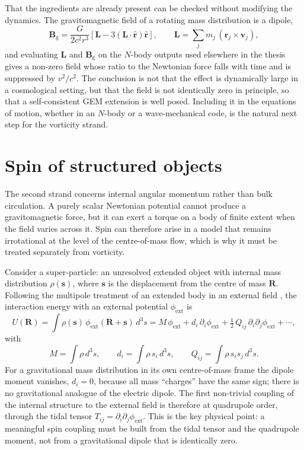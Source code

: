 \documentclass[11pt,a4paper]{article}
\newcommand{\rr}{\mathbf{r}}
\newcommand{\svec}{\mathbf{s}}
\newcommand{\RR}{\mathbf{R}}
\newcommand{\Bg}{\mathbf{B}_{\mathrm{g}}}
\newcommand{\half}{\tfrac{1}{2}}
\begin{document}
That the ingredients are already present can be checked without modifying the dynamics.
The gravitomagnetic field of a rotating mass distribution is a dipole,
%
\begin{equation}
  \Bg = \frac{G}{2c^2 r^3}\left[ \mathbf{L} - 3(\mathbf{L}\cdot\hat{\mathbf{r}})
  \hat{\mathbf{r}} \right],
  \qquad
  \mathbf{L} = \sum_j m_j\,(\rr_j\times\mathbf{v}_j),
\end{equation}
%
and evaluating $\mathbf{L}$ and $\Bg$ on the $N$-body outputs used elsewhere in the
thesis gives a non-zero field whose ratio to the Newtonian force falls with time and is
suppressed by $v^2/c^2$. The conclusion is not that the effect is dynamically large in a
cosmological setting, but that the field is not identically zero in principle, so that a
self-consistent GEM extension is well posed. Including it in the equations of motion,
whether in an $N$-body or a wave-mechanical code, is the natural next step for the
vorticity strand.

\section{Spin of structured objects}
\label{sec:spin}

The second strand concerns internal angular momentum rather than bulk circulation. A
purely scalar Newtonian potential cannot produce a gravitomagnetic force, but it can
exert a torque on a body of finite extent when the field varies across it. Spin can
therefore arise in a model that remains irrotational at the level of the centre-of-mass
flow, which is why it must be treated separately from vorticity.

Consider a super-particle: an unresolved extended object with internal mass
distribution $\rho(\svec)$, where $\svec$ is the displacement from the centre of mass
$\RR$. Following the multipole treatment of an extended body in an external field
\citep{jackson1998}, the interaction energy with an external potential
$\phi_{\mathrm{ext}}$ is
%
\begin{equation}
  U(\RR) = \int \rho(\svec)\,\phi_{\mathrm{ext}}(\RR+\svec)\,d^3 s
  = M\,\phi_{\mathrm{ext}}
  + d_i\,\partial_i \phi_{\mathrm{ext}}
  + \half\,Q_{ij}\,\partial_i\partial_j \phi_{\mathrm{ext}}
  + \cdots,
  \label{eq:multipole}
\end{equation}
%
with
%
\begin{equation}
  M = \int \rho\,d^3 s, \qquad
  d_i = \int \rho\,s_i\,d^3 s, \qquad
  Q_{ij} = \int \rho\,s_i s_j\,d^3 s .
\end{equation}
%
For a gravitational mass distribution in its own centre-of-mass frame the dipole moment
vanishes, $d_i = 0$, because all mass ``charges'' have the same sign; there is no
gravitational analogue of the electric dipole. The first non-trivial coupling of the
internal structure to the external field is therefore at quadrupole order, through the
tidal tensor $T_{ij} = \partial_i\partial_j\phi_{\mathrm{ext}}$. This is the key
physical point: a meaningful spin coupling must be built from the tidal tensor and the
quadrupole moment, not from a gravitational dipole that is identically zero.
\end{document}
